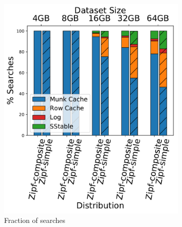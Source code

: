 \begin{figure}[htb]
\centering
\begin{subfigure}{0.49\linewidth}
\includegraphics[width=\textwidth]{figs/Time_percentage_A.pdf}
\caption{Fraction of searches}
\label{fig:readstat:dist}
\end{subfigure}
\begin{subfigure}{0.49\linewidth}

\end{subfigure}
\end{figure}

